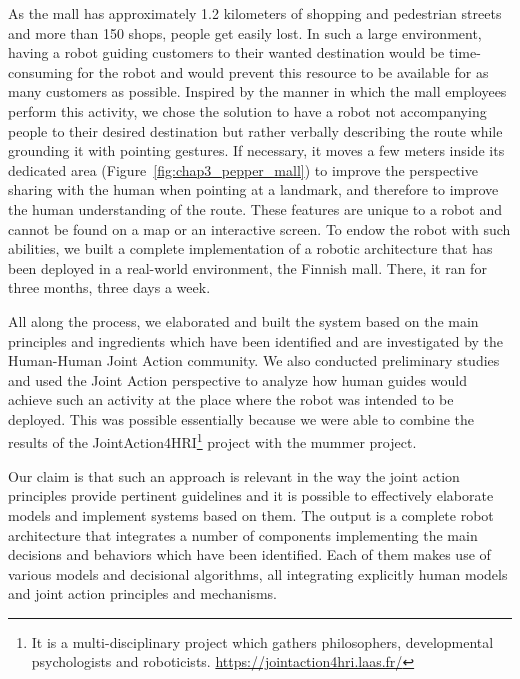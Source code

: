 \documentclass[a4paper,11pt,twoside]{StyleThese}
\begin{document}
As the mall has approximately 1.2 kilometers of shopping and pedestrian streets and more than 150 shops, people get easily lost. In such a large environment, having a robot guiding customers to their wanted destination would be time-consuming for the robot and would prevent this resource to be available for as many customers as possible. Inspired by the manner in which the mall employees perform this activity, we chose the solution to have a robot not accompanying people to their desired destination but rather verbally describing the route while grounding it with pointing gestures. If necessary, it moves a few meters inside its dedicated area (Figure~\ref{fig:chap3_pepper_mall}) to improve the perspective sharing with the human when pointing at a landmark, and therefore to improve the human understanding of the route. These features are unique to a robot and cannot be found on a map or an interactive screen. To endow the robot with such abilities, we built a complete implementation of a robotic architecture that has been deployed in a real-world environment, the Finnish mall. There, it ran for three months, three days a week.

All along the process, we elaborated and built the system based on the main principles and ingredients which have been identified and are investigated by the Human-Human Joint Action community. We also conducted preliminary studies and used the Joint Action perspective to analyze how human guides would achieve such an activity at the place where the robot was intended to be deployed. This was possible essentially because we were able to combine the results of the JointAction4HRI\footnote{It is a multi-disciplinary project which gathers philosophers, developmental psychologists and roboticists. \url{https://jointaction4hri.laas.fr/}} project with the \acrshort{mummer} project.

Our claim is that such an approach is relevant in the way the joint action principles provide pertinent guidelines and it is possible to effectively elaborate models and implement systems based on them. 
The output is a complete robot architecture that integrates a number of components implementing the main decisions and behaviors which have been identified. Each of them makes use of various models and decisional algorithms, all integrating explicitly human models and joint action principles and mechanisms.
\end{document}
